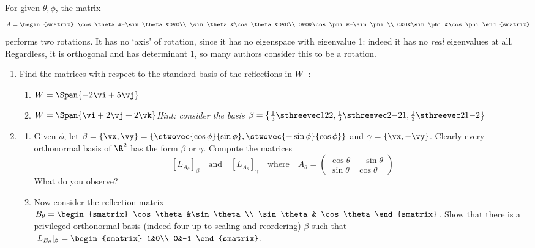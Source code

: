 \begin{example}{}{}
For given $\theta,\phi$, the matrix
\[A=\begin{smatrix}
  \cos\theta&-\sin\theta&0&0\\
  \sin\theta&\cos\theta&0&0\\
  0&0&\cos\phi&-\sin\phi\\
  0&0&\sin\phi&\cos\phi
\end{smatrix}\]
performs two rotations. It has no `axis' of rotation, since it has no eigenspace with eigenvalue 1: indeed it has no \emph{real} eigenvalues at all. Regardless, it is orthogonal and has determinant 1, so many authors consider this to be a rotation.
\end{example}

\begin{exercises}
\begin{enumerate}[label=\thesubsection.\arabic*., align=right]
	\item Find the matrices with respect to the standard basis of the reflections in $W^\perp$:
	\begin{enumerate}
	  \item $W=\Span\{-2\vi+5\vj\}$
	  \item $W=\Span\{\vi+2\vj+2\vk\}$\quad  \emph{Hint: consider the basis $\beta=\left\{\frac 13\sthreevec 122,\frac 13\sthreevec 2{-2}1,\frac 13\sthreevec 21{-2}\right\}$}
	\end{enumerate}
	
  \item\begin{enumerate}
  	\item Given $\phi$, let $\beta=\{\vx,\vy\}=\left\{\stwovec{\cos\phi}{\sin\phi},\stwovec{-\sin\phi}{\cos\phi}\right\}$ and $\gamma=\{\vx,-\vy\}$. Clearly every orthonormal basis of $\R^2$ has the form $\beta$ or $\gamma$. Compute the matrices
  	\[[L_{A_\theta}]_\beta\quad\text{and}\quad[L_{A_\theta}]_\gamma\quad\text{where}\quad A_\theta=\begin{pmatrix}
		\cos\theta&-\sin\theta\\
		\sin\theta&\cos\theta
  	\end{pmatrix}\]
  	What do you observe?
  	\item Now consider the reflection matrix $B_\theta=\begin{smatrix}
		\cos\theta&\sin\theta\\
		\sin\theta&-\cos\theta
  	\end{smatrix}$. Show that there is a privileged orthonormal basis (indeed four up to scaling and reordering) $\beta$ such that $[L_{B_\theta}]_\beta=\begin{smatrix}
		1&0\\
		0&-1
  	\end{smatrix}$.
 	\end{enumerate}
 	

\end{enumerate}
\end{exercises}
